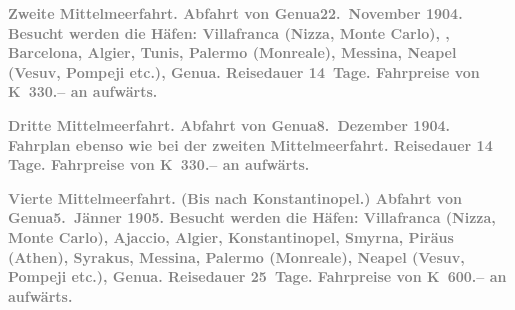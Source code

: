 \pstart
           \textcolor{gray}{\textbf{\textbf{Zweite Mittelmeerfahrt.}
                  Abfahrt von Genua\textbf{22. November 1904}. Besucht werden die Häfen: Villafranca
                     (Nizza, Monte Carlo), \label{T_L01495-1v}\label{T_L01495-1}, Barcelona, Algier, Tunis, Palermo (Monreale), Messina, Neapel (Vesuv, Pompeji etc.),
                     Genua. Reisedauer 14 Tage. Fahrpreise von
                     \textbf{K 330.–} an aufwärts.}}\pend
           
\pstart
           \textcolor{gray}{\textbf{\textbf{Dritte Mittelmeerfahrt.}
                  Abfahrt von Genua\textbf{8. Dezember 1904}. Fahrplan ebenso wie bei der zweiten Mittelmeerfahrt. Reisedauer 14 Tage. Fahrpreise von \textbf{K 330.–} an aufwärts.}}\pend
           
\pstart
           \textcolor{gray}{\textbf{\textbf{Vierte Mittelmeerfahrt.}
                  (Bis nach Konstantinopel.) Abfahrt von Genua\textbf{5. Jänner 1905}. Besucht werden die Häfen: Villafranca
                     (Nizza, Monte Carlo), Ajaccio, Algier, Konstantinopel, Smyrna, Piräus (Athen), Syrakus, Messina, Palermo (Monreale), Neapel (Vesuv, Pompeji etc.), Genua.
                  Reisedauer 25 Tage. Fahrpreise von \textbf{K 600.–} an aufwärts.}}\pend
           
